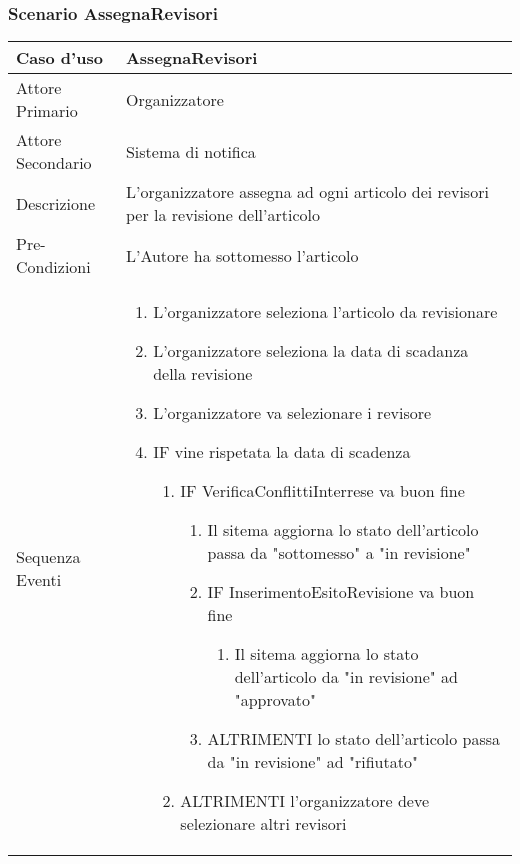 \subsubsection{Scenario AssegnaRevisori}
\begin{tabular}{|p{3cm}|p{7cm}|}
\hline 
\rowcolor{Orchid}
Caso d'uso & AssegnaRevisori\\
\hline
Attore Primario & Organizzatore\\
\hline
Attore Secondario & Sistema di notifica\\
\hline
Descrizione &L'organizzatore  assegna ad ogni articolo dei revisori per la revisione dell'articolo\\
\hline
Pre-Condizioni& L'Autore ha sottomesso l'articolo\\
\hline
  Sequenza Eventi&
                   \begin{enumerate}
                   \item L'organizzatore seleziona l'articolo da revisionare
                   \item L'organizzatore seleziona la data di scadanza della revisione
                   \item L'organizzatore va selezionare i revisore
                   \item IF vine rispetata la data di scadenza
                   \begin{enumerate}
                    \item IF VerificaConflittiInterrese va buon fine
                    \begin{enumerate}
                      \item Il sitema aggiorna lo stato dell'articolo passa da "sottomesso" a "in revisione"
                      \item IF InserimentoEsitoRevisione va buon fine
                      \begin{enumerate}
                        \item Il sitema aggiorna lo stato dell'articolo da "in revisione" ad "approvato"
                      \end{enumerate}
                      \item ALTRIMENTI lo stato dell'articolo passa da "in revisione" ad "rifiutato"
                    \end{enumerate}
                    \item ALTRIMENTI l'organizzatore deve selezionare altri revisori
                   \end{enumerate}

\end{enumerate}
\end{tabular}
